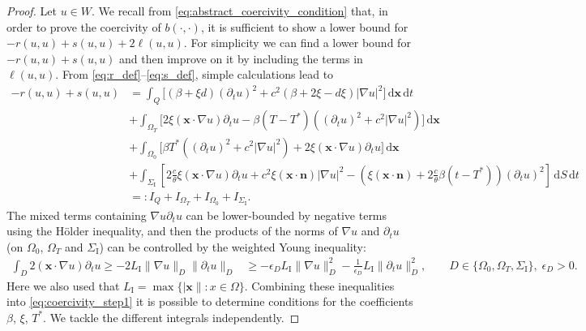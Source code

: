 \documentclass[10pt,a4paper]{amsart}
\newcommand{\Grad}[1]{\nabla #1}
\newcommand{\LI}{L_{\mathrm I}}
\newcommand{\OT}{{\Omega_T}}
\newcommand{\OZ}{{\Omega_0}}
\newcommand{\SI}{{\Sigma_{\mathrm I}}}
\newcommand{\TimeDer}{{\partial^{}_t}}
\newcommand{\dS}{{\,\mathrm{d}S}}
\newcommand{\dt}{{\,\mathrm{d}t}}
\newcommand{\dx}{{\,\mathrm{d}\vect x}}
\newcommand{\norm}[1]{\|#1\|}
\newcommand{\vect}[1]{\bm{#1}}
\newcommand{\vx}{{\vect x}}
\begin{document}
\begin{proof}
	Let $u \in W$.
	We recall from \eqref{eq:abstract_coercivity_condition} that, in order to prove the coercivity of $b(\cdot,\cdot)$, it is sufficient to show a lower bound for $-r(u,u) + s(u,u) + 2\ell(u,u)$. For simplicity we can find a lower bound for $-r(u,u) + s(u,u)$ and then improve on it by including the terms in $\ell(u,u)$.
	From \eqref{eq:r_def}--\eqref{eq:s_def}, simple calculations lead to
	\begin{align}\nonumber
		-r(u,u) + s(u,u) & =
		\int_{Q} \big[
			(\beta + \xi d) (\TimeDer{u})^2
			+ c^2 ( \beta + 2\xi - d\xi)|\Grad u|^2
		\big] \dx \dt                                           \\ \nonumber
		                 & + \int_{\OT} \big[
			2 \xi (\vect{x} \cdot \Grad u) \TimeDer{u}
			- \beta (T-T^*)\left(
			(\TimeDer{u})^2
			+ c^2 |\Grad u|^2
		\right) \big] \dx                                       \\
		                 & + \int_{\OZ}
		\big[\beta T^* \left(
			(\TimeDer{u})^2
			+ c^2 |\Grad u|^2\right)
			+ 2 \xi (\vect{x} \cdot \Grad u) \TimeDer{u} \big]\dx
		\label{eq:coercivity_step1}                             \\
		                 & + \int_{{\SI}} \left[
			2 \frac c\theta\xi (\vect{x} \cdot \Grad u) \TimeDer{u}
+ c^2 \xi (\vect{x} \cdot \vect{n}) |\Grad u|^2
			- \left(\xi (\vect{x} \cdot \vect{n})
			+ 2\frac{c}{\theta}{\beta} (t-T^*)\right) (\TimeDer{u})^2
			\right] \dS \dt
		\nonumber
		\\
		                 & =: I_Q+I_\OT+I_\OZ+I_{\SI}.\nonumber
	\end{align}
	The mixed terms containing $\Grad u \TimeDer{u}$ can be lower-bounded by negative terms using the H\"older inequality, and then the products of the norms of $\Grad u$ and $\TimeDer{u}$ (on $\OZ$, $\OT$ and ${\SI}$) can be controlled by the weighted Young inequality:
\begin{align*}
		\int_{D}2  (\vect{x} \cdot \Grad u) \TimeDer{u} \ge - 2 \LI \norm{\Grad u}_D \norm{\TimeDer{u}}_D
		 & \geq -\epsilon_D \LI \norm{\Grad u}^2_D -\frac{1}{\epsilon_D} \LI \norm{\TimeDer{u}}^2_D,
		\qquad D\in\{\Omega_0,\Omega_T,{\SI}\},\; \epsilon_D>0.
	\end{align*}
Here we also used that $\LI = \max\{|\vx\|: x\in\Omega\}$.
	Combining these inequalities into \eqref{eq:coercivity_step1} it is possible to determine conditions for the coefficients $\beta$, $\xi$, $T^*$.
	We tackle the different integrals independently.


\end{proof}
\end{document}
